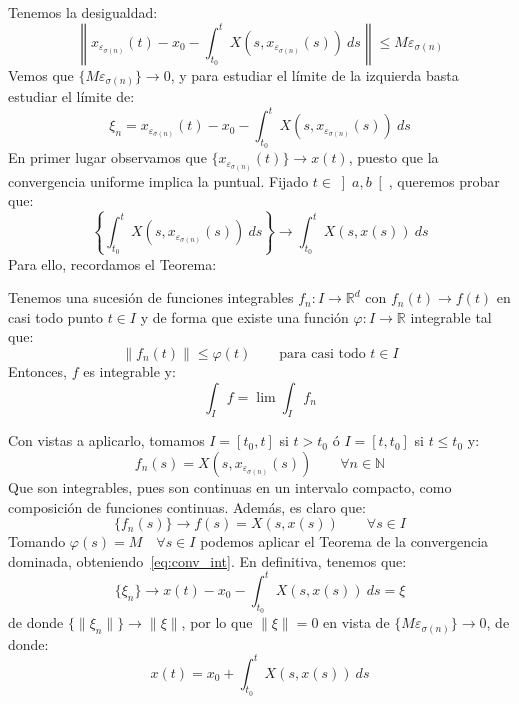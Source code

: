 \noindent
Tenemos la desigualdad:
\begin{equation*}
    \left\|x_{\varepsilon_{\sigma(n)}}(t)-x_0 - \int_{t_0}^{t} X(s,x_{\varepsilon_{\sigma(n)}}(s))~ds \right\| \leq M\varepsilon_{\sigma(n)}
\end{equation*}
Vemos que $\{M\varepsilon_{\sigma(n)}\}\to 0$, y para estudiar el límite de la izquierda basta estudiar el límite de:
\begin{equation*}
    \xi_n = x_{\varepsilon_{\sigma(n)}}(t)-x_0 - \int_{t_0}^{t} X(s,x_{\varepsilon_{\sigma(n)}}(s))~ds 
\end{equation*}
En primer lugar observamos que $\{x_{\varepsilon_{\sigma(n)}}(t)\} \to x(t)$, puesto que la convergencia uniforme implica la puntual. Fijado $t\in \left]a,b\right[$, queremos probar que:
\begin{equation}\label{eq:conv_int}
    \left\{\int_{t_0}^{t} X(s,x_{\varepsilon_{\sigma(n)}}(s))~ds\right\}  \to \int_{t_0}^{t} X(s,x(s))~ds 
\end{equation}
Para ello, recordamos el Teorema:
\begin{teo}
    Tenemos una sucesión de funciones integrables $f_n:I\to \mathbb{R}^d$ con $f_n(t)\to f(t)$ en casi todo punto $t\in I$ y de forma que existe una función $\varphi:I\to \mathbb{R}$ integrable tal que:
    \begin{equation*}
        \|f_n(t)\| \leq \varphi(t) \qquad \text{para casi todo\ } t\in I
    \end{equation*}
    Entonces, $f$ es integrable y:
    \begin{equation*}
        \int_I f = \lim \int_I f_n
    \end{equation*}
\end{teo}

\noindent
Con vistas a aplicarlo, tomamos $I = [t_0,t]$ si $t>t_0$ ó $I = [t,t_0]$ si $t\leq t_0$ y:
\begin{equation*}
    f_n(s) = X(s,x_{\varepsilon_{\sigma(n)}}(s)) \qquad \forall n\in \mathbb{N}
\end{equation*}
Que son integrables, pues son continuas en un intervalo compacto, como composición de funciones continuas. Además, es claro que:
\begin{equation*}
    \{f_n(s)\} \to f(s) = X(s,x(s)) \qquad \forall s\in I
\end{equation*}
Tomando $\varphi(s) = M\quad \forall s\in I$ podemos aplicar el Teorema de la convergencia dominada, obteniendo~\eqref{eq:conv_int}. En definitiva, tenemos que:
\begin{equation*}
    \{\xi_n\} \to x(t) - x_0 - \int_{t_0}^{t} X(s,x(s))~ds = \xi
\end{equation*}
de donde $\{\|\xi_n\|\}\to \|\xi\|$, por lo que $\|\xi\| = 0$ en vista de $\{M\varepsilon_{\sigma(n)}\}\to 0$, de donde:
\begin{equation*}
    x(t) = x_0 + \int_{t_0}^{t} X(s,x(s))~ds 
\end{equation*} 

